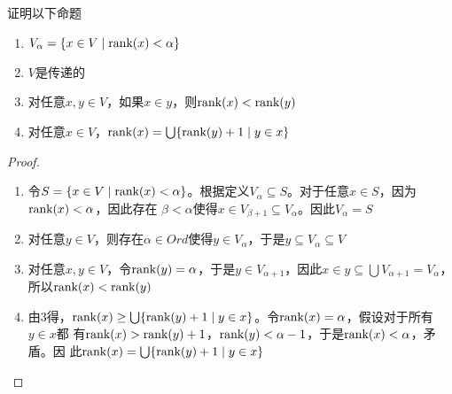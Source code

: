 \documentclass[11pt]{article}
\begin{document}
\begin{exercise}[1.3.45]
证明以下命题
\begin{enumerate}
\item \(V_\alpha=\{x\in V\mid\text{rank}(x)<\alpha\}\)
\item \(V\)是传递的
\item 对任意\(x,y\in V\)，如果\(x\in y\)，则\(\text{rank}(x)<\text{rank}(y)\)
\item 对任意\(x\in V\)，\(\text{rank}(x)=\bigcup\{\text{rank}(y)+1\mid y\in x\}\)
\end{enumerate}
\end{exercise}

\begin{proof}
\begin{enumerate}
\item 令\(S=\{x\in V\mid\text{rank}(x)<\alpha\}\)。根据定义\(V_\alpha\subseteq S\)。对于任意\(x\in S\)，因为\(\text{rank}(x)<\alpha\)，因此存在
\(\beta<\alpha\)使得\(x\in V_{\beta+1}\subseteq V_\alpha\)。因此\(V_\alpha=S\)
\item 对任意\(y\in V\)，则存在\(\alpha\in Ord\)使得\(y\in V_\alpha\)，于是\(y\subseteq V_\alpha\subseteq V\)
\item 对任意\(x,y\in V\)，令\(\text{rank}(y)=\alpha\)，于是\(y\in V_{\alpha+1}\)，因此\(x\in y\subseteq\bigcup V_{\alpha+1}=V_\alpha\)，所以\(\text{rank}(x)<\text{rank}(y)\)
\item 由3得，\(\text{rank}(x)\ge\bigcup\{\text{rank}(y)+1\mid y\in x\}\)。令\(\text{rank}(x)=\alpha\)，假设对于所有\(y\in x\)都
有\(\text{rank}(x)>\text{rank}(y)+1\)，\(\text{rank}(y)<\alpha-1\)，于是\(\text{rank}(x)<\alpha\)，矛盾。因
此\(\text{rank}(x)=\bigcup\{\text{rank}(y)+1\mid y\in x\}\)
\end{enumerate}
\end{proof}
\end{document}
